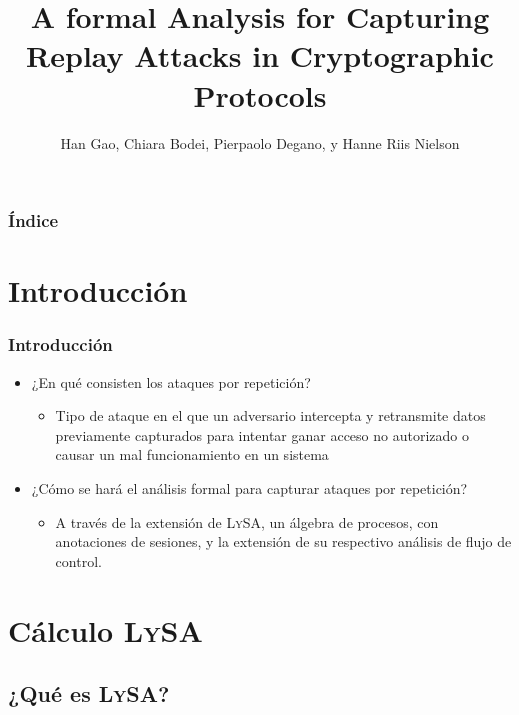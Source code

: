 \documentclass{beamer}
\title{A formal Analysis for Capturing Replay Attacks in Cryptographic Protocols}
\subtitle{}
\author{Han Gao, Chiara Bodei, Pierpaolo Degano, y Hanne Riis Nielson}
\institute{Katherine Sullivan \newline FCEIA - UNR}
\date{}
\begin{document}
\begin{frame}
    \titlepage
\end{frame}


\begin{frame}
    \frametitle{Índice}
    \tableofcontents
\end{frame}

\section{Introducción}
\begin{frame}
    \frametitle{Introducción}
    \pause
    \begin{itemize}
        \item<2-> ¿En qué consisten los ataques por repetición?
            \begin{itemize}
                \item<3-> Tipo de ataque en el que un adversario intercepta y retransmite datos previamente capturados para intentar ganar acceso no autorizado o causar un mal funcionamiento en un sistema
            \end{itemize}
        \vspace{0.75cm}
        \item<4-> ¿Cómo se hará el análisis formal para capturar ataques por repetición?
            \begin{itemize}
                \item<5-> A través de la extensión de L\textsc{y}S\textsc{A}, un álgebra de procesos, con anotaciones de sesiones, y la extensión de su respectivo análisis \newline de flujo de control.
            \end{itemize}
    \end{itemize}
\end{frame}

\section{Cálculo L\textsc{y}S\textsc{A}}
\subsection{¿Qué es L\textsc{y}S\textsc{A}?}
\end{document}
